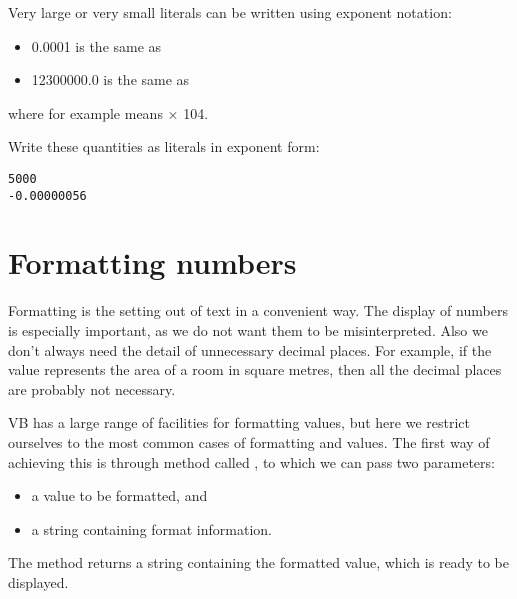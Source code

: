 		Very large or very small  literals can be written using exponent notation:
		\begin{itemize}
			\item 0.0001 is the same as 
			\item 12300000.0 is the same as 
		\end{itemize}
		where for example  means × 104.
		
		\begin{stqb}
			\begin{STQ}
			\item	Write these quantities as literals in exponent form:
				\begin{lstlisting}
5000
-0.00000056
				\end{lstlisting}
			\end{STQ}
		\end{stqb}


	\section{Formatting numbers}
	Formatting is the setting out of text in a convenient way. The display of numbers is especially important, as we do not want them to be misinterpreted. Also we don't always need the detail of unnecessary decimal places. For example, if the value  represents the area of a room in square metres, then all the decimal places are probably not necessary.
		
	VB has a large range of facilities for formatting values, but here we restrict ourselves to the most common cases of formatting  and  values. The first way of achieving this is through method called , to which we can pass two parameters:
		\begin{itemize}
      \item a value to be formatted, and
      \item a string containing format information.
		\end{itemize}
		The method returns a string containing the formatted value, which is ready to be displayed.
		
